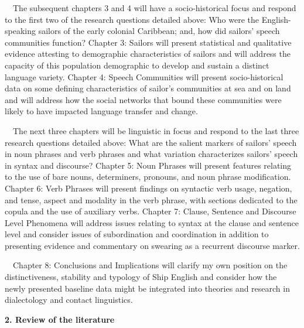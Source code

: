 \begin{styleNormali}
\ \ The subsequent chapters 3 and 4 will have a socio-historical focus and respond to the first two of the research questions detailed above: Who were the English-speaking sailors of the early colonial Caribbean; and, how did sailors’ speech communities function? Chapter 3: Sailors will present statistical and qualitative evidence attesting to demographic characteristics of sailors and will address the capacity of this population demographic to develop and sustain a distinct language variety. Chapter 4: Speech Communities will present socio-historical data on some defining characteristics of sailor’s communities at sea and on land and will address how the social networks that bound these communities were likely to have impacted language transfer and change. \ 
\end{styleNormali}


\begin{styleNormali}
\ \ The next three chapters will be linguistic in focus and respond to the last three research questions detailed above: What are the salient markers of sailors’ speech in noun phrases and verb phrases and what variation characterizes sailors’ speech in syntax and discourse? Chapter 5: Noun Phrases will present features relating to the use of bare nouns, determiners, pronouns, and noun phrase modification. Chapter 6: Verb Phrases will present findings on syntactic verb usage, negation, and tense, aspect and modality in the verb phrase, with sections dedicated to the copula and the use of auxiliary verbs. Chapter 7: Clause, Sentence and Discourse Level Phenomena will address issues relating to syntax at the clause and sentence level and consider issues of subordination and coordination in addition to presenting evidence and commentary on swearing as a recurrent discourse marker.
\end{styleNormali}


\begin{styleNormali}
\ \ Chapter 8: Conclusions and Implications will clarify my own position on the distinctiveness, stability and typology of Ship English and consider how the newly presented baseline data might be integrated into theories and research in dialectology and contact linguistics.
\end{styleNormali}


\clearpage\begin{styleStandard}
\textbf{2. Review of the literature}
\end{styleStandard}


